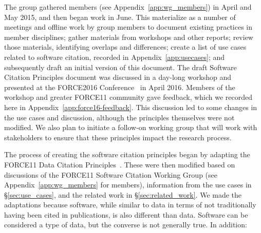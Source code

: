 \documentclass[12pt, oneside]{amsart}
\begin{document}
The group gathered members (see Appendix~\ref{app:wg_members}) in April and
May 2015, and then began work in June. This materialize as a number of meetings
and offline work by group members to document existing
practices in member disciplines; gather materials from workshops and other
reports; review those materials, identifying overlaps and differences;
create a list of use cases related to software citation, recorded in
Appendix~\ref{app:usecases}; and subsequently draft an initial version of this document.
The draft Software Citation Principles document was discussed in a day-long
workshop and presented at the FORCE2016 Conference~\cite{force2016} in April 2016.
Members of the workshop and greater FORCE11 community gave feedback, which we
recorded here in Appendix~\ref{app:force16-feedback}. This discussion led to
some changes in the use cases and discussion, although the principles themselves
were not modified. We also plan to initiate a follow-on working group that will
work with stakeholders to ensure that these principles impact the research process.

The process of creating the software citation principles began by adapting
the FORCE11 Data Citation Principles~\cite{data-citation-principles}. These
were then modified based on discussions of the FORCE11 Software Citation
Working Group (see Appendix~\ref{app:wg_members} for members), information from
the use cases in \S\ref{sec:use_cases}, and the related work in
\S\ref{sec:related_work}.
We made the adaptations because software, while similar to data in terms of
not traditionally having been cited in publications, is also different than
data. Software can be considered a type of data, but the converse is not
generally true. In addition:
\end{document}

